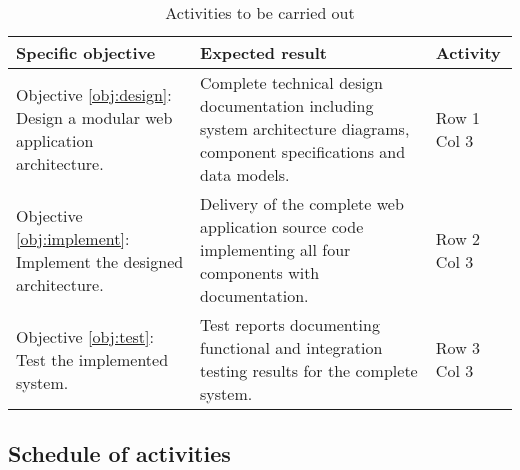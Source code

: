 \begin{table}[htbp]
	\centering
	\caption{Activities to be carried out}
	\label{tab:activities}
	\begin{tabularx}{\textwidth}{>{\raggedright\arraybackslash}p{4cm}XX}
		\toprule
		\textbf{Specific objective} & \textbf{Expected result} & \textbf{Activity} \\
		\midrule
		Objective \ref{obj:design}: Design a modular web application architecture. & Complete technical design documentation including system architecture diagrams, component specifications and data models. & Row 1 Col 3 \\
		\midrule
		Objective \ref{obj:implement}: Implement the designed architecture. & Delivery of the complete web application source code implementing all four components with documentation. & Row 2 Col 3 \\
		\midrule
		Objective \ref{obj:test}: Test the implemented system. & Test reports documenting functional and integration testing results for the complete system. & Row 3 Col 3 \\
		\bottomrule
	\end{tabularx}
\end{table}

\subsection{Schedule of activities}
